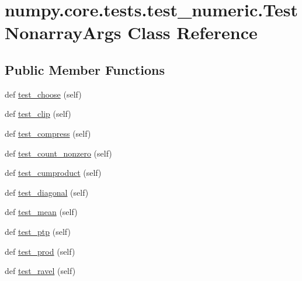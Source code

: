 \hypertarget{classnumpy_1_1core_1_1tests_1_1test__numeric_1_1TestNonarrayArgs}{}\section{numpy.\+core.\+tests.\+test\+\_\+numeric.\+Test\+Nonarray\+Args Class Reference}
\label{classnumpy_1_1core_1_1tests_1_1test__numeric_1_1TestNonarrayArgs}
\subsection*{Public Member Functions}
\begin{DoxyCompactItemize}
\item 
def \hyperlink{classnumpy_1_1core_1_1tests_1_1test__numeric_1_1TestNonarrayArgs_a2a731140d060fd67d57403d519640b66}{test\+\_\+choose} (self)
\item 
def \hyperlink{classnumpy_1_1core_1_1tests_1_1test__numeric_1_1TestNonarrayArgs_af1c6a82cda33771ce2fdfeb58a4b7b7f}{test\+\_\+clip} (self)
\item 
def \hyperlink{classnumpy_1_1core_1_1tests_1_1test__numeric_1_1TestNonarrayArgs_a15ae738e9313d511d471b9e8d3eee7e2}{test\+\_\+compress} (self)
\item 
def \hyperlink{classnumpy_1_1core_1_1tests_1_1test__numeric_1_1TestNonarrayArgs_aa6151ccd6d6a1f330861b91a3e9efac2}{test\+\_\+count\+\_\+nonzero} (self)
\item 
def \hyperlink{classnumpy_1_1core_1_1tests_1_1test__numeric_1_1TestNonarrayArgs_a65d31fed250d34ffdc677f8b63dc1d97}{test\+\_\+cumproduct} (self)
\item 
def \hyperlink{classnumpy_1_1core_1_1tests_1_1test__numeric_1_1TestNonarrayArgs_a2448dd2790f77f2847a7a07794ff47c8}{test\+\_\+diagonal} (self)
\item 
def \hyperlink{classnumpy_1_1core_1_1tests_1_1test__numeric_1_1TestNonarrayArgs_a15dd4f812b8d4aa30edf0a0e3357dbcc}{test\+\_\+mean} (self)
\item 
def \hyperlink{classnumpy_1_1core_1_1tests_1_1test__numeric_1_1TestNonarrayArgs_a19ac36ed2daafd36741648d0b9029ab3}{test\+\_\+ptp} (self)
\item 
def \hyperlink{classnumpy_1_1core_1_1tests_1_1test__numeric_1_1TestNonarrayArgs_a7b5ce759b381c2fadf281a89e311d396}{test\+\_\+prod} (self)
\item 
def \hyperlink{classnumpy_1_1core_1_1tests_1_1test__numeric_1_1TestNonarrayArgs_a629ca964482a9c9a4c3e3245ba90e990}{test\+\_\+ravel} (self)

\end{DoxyCompactItemize}
